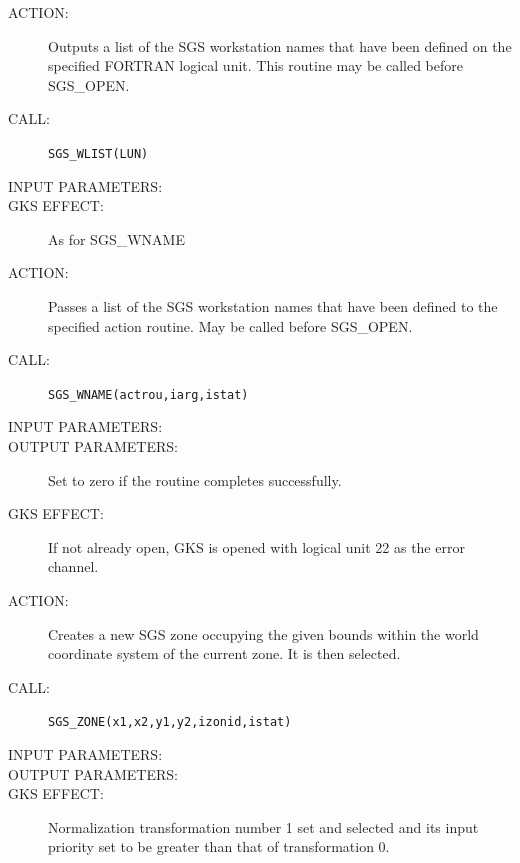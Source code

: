 \documentclass[11pt]{article}
\newcommand{\htmlref}[2]{#1}
\begin{document}
\begin{description}
\item [ACTION:]
Outputs a list of the SGS workstation names that have been defined on the
specified FORTRAN logical unit.
This routine may be called before \htmlref{SGS\_OPEN}{SGS_OPEN}.
\item [CALL:]
{\tt SGS\_WLIST(LUN)}
\item [INPUT PARAMETERS:]
\begin{params}
\end{params}
\item [GKS EFFECT:]
As for SGS\_WNAME
\end{description}
\goodbreak

\begin{description}
\item [ACTION:]
Passes a list of the SGS workstation names that have been defined to the
specified action routine.
May be called before SGS\_OPEN.
\item [CALL:]
{\tt SGS\_WNAME(actrou,iarg,istat)}
\item [INPUT PARAMETERS:]
\begin{params}
\end{params}
\item [OUTPUT PARAMETERS:]
\begin{params}
Set to zero if the routine completes successfully.
\end{params}
\item [GKS EFFECT:]
If not already open, GKS is opened with logical unit 22 as the error channel.
\end{description}
\goodbreak

\begin{description}
\item [ACTION:]
Creates a new SGS zone occupying the given bounds within the world
coordinate system of the current zone.
It is then selected.
\item [CALL:]
{\tt SGS\_ZONE(x1,x2,y1,y2,izonid,istat)}
\item [INPUT PARAMETERS:]
\begin{params}
\end{params}
\item [OUTPUT PARAMETERS:]
\begin{params}
\end{params}
\item [GKS EFFECT:]
Normalization transformation number 1 set and selected and its input priority
set to be greater than that of transformation 0.
\end{description}
\goodbreak
\end{document}
